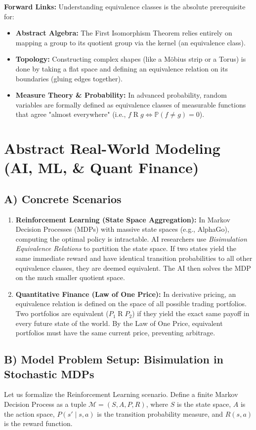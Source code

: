 \documentclass[11pt, a4paper]{article}
\theoremstyle{definition}
\theoremstyle{remark}
\newcommand{\Prob}{\mathbb{P}}
\begin{document}
\textbf{Forward Links:} Understanding equivalence classes is the absolute prerequisite for:
\begin{itemize}
    \item \textbf{Abstract Algebra:} The First Isomorphism Theorem relies entirely on mapping a group to its quotient group via the kernel (an equivalence class).
    \item \textbf{Topology:} Constructing complex shapes (like a Möbius strip or a Torus) is done by taking a flat space and defining an equivalence relation on its boundaries (gluing edges together).
    \item \textbf{Measure Theory \& Probability:} In advanced probability, random variables are formally defined as equivalence classes of measurable functions that agree "almost everywhere" (i.e., $f \mathrel{R} g \iff \Prob(f \neq g) = 0$).
\end{itemize}

\section{Abstract Real-World Modeling (AI, ML, \& Quant Finance)}

\subsection{A) Concrete Scenarios}
\begin{enumerate}
    \item \textbf{Reinforcement Learning (State Space Aggregation):} In Markov Decision Processes (MDPs) with massive state spaces (e.g., AlphaGo), computing the optimal policy is intractable. AI researchers use \textit{Bisimulation Equivalence Relations} to partition the state space. If two states yield the same immediate reward and have identical transition probabilities to all other equivalence classes, they are deemed equivalent. The AI then solves the MDP on the much smaller quotient space.
    \item \textbf{Quantitative Finance (Law of One Price):} In derivative pricing, an equivalence relation is defined on the space of all possible trading portfolios. Two portfolios are equivalent ($P_1 \mathrel{R} P_2$) if they yield the exact same payoff in every future state of the world. By the Law of One Price, equivalent portfolios must have the same current price, preventing arbitrage.
\end{enumerate}

\subsection{B) Model Problem Setup: Bisimulation in Stochastic MDPs}
Let us formalize the Reinforcement Learning scenario. 
Define a finite Markov Decision Process as a tuple $\mathcal{M} = (S, A, P, R)$, where $S$ is the state space, $A$ is the action space, $P(s' \mid s, a)$ is the transition probability measure, and $R(s, a)$ is the reward function.
\end{document}
